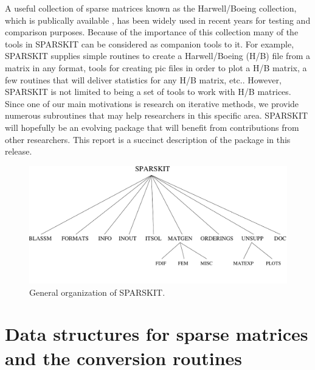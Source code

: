 \documentclass[12pt]{article}
\begin{document}
A useful collection of sparse matrices known as the Harwell/Boeing
collection, which is publically available \cite{Duff-HB}, has been
widely used in recent years for testing and comparison purposes.
Because of the importance of this collection many of the tools in
SPARSKIT can be considered as companion tools to it. For
example, SPARSKIT supplies simple routines to create a Harwell/Boeing (H/B)
file from a matrix in any format, tools for creating pic files in
order to plot a H/B matrix, a few routines that will deliver
statistics for any H/B matrix, etc.. However, SPARSKIT is not limited
to being a set of tools to 
work with H/B matrices. Since one of our main motivations is
research on iterative methods, we provide numerous subroutines that may help
researchers in this specific area.  
SPARSKIT will hopefully be an evolving package
that will benefit from contributions from other researchers. This
report is a succinct description of the  package in this release.

\begin{figure}[h]
\includegraphics[width=15cm]{dir}
\caption {General organization of SPARSKIT.}
\label{organization}
\end{figure}

\section{Data structures for sparse matrices and the conversion routines}
\end{document}
